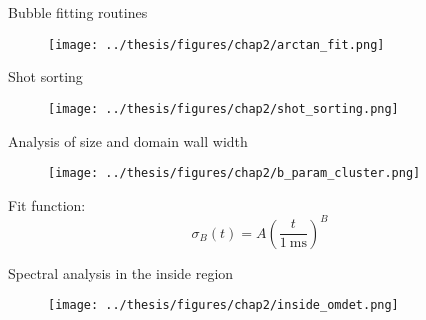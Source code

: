 \documentclass[aspectratio=169]{beamer}
\begin{document}
\begin{frame}{Bubble fitting routines}
  \begin{figure}
      \centering
      \texttt{[image: ../thesis/figures/chap2/arctan\_fit.png]}
  \end{figure}
\end{frame}

\begin{frame}{Shot sorting}
  \begin{figure}
      \centering
      \texttt{[image: ../thesis/figures/chap2/shot\_sorting.png]}
  \end{figure}
\end{frame}

\begin{frame}{Analysis of size and domain wall width}
  \begin{minipage}{0.70\textwidth}
    \begin{figure}
        \centering
        \texttt{[image: ../thesis/figures/chap2/b\_param\_cluster.png]}
    \end{figure}
  \end{minipage}
  \hspace{0.01\textwidth}
  \begin{minipage}{0.27\textwidth}
    Fit function:
    \[
      \sigma_B(t) = A\left(\frac{t}{1\ \unit{\milli\second}}\right)^B
    \]  
  \end{minipage}
\end{frame}

\begin{frame}{Spectral analysis in the inside region}
  \begin{figure}
      \centering
      \texttt{[image: ../thesis/figures/chap2/inside\_omdet.png]}
  \end{figure}
\end{frame}

\end{document}
